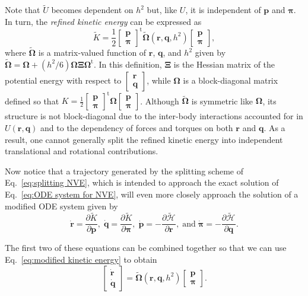\documentclass[
	aip,
	jcp,
	reprint,
]{revtex4-1}
\newcommand{\mt}[1]{\boldsymbol{\mathbf{#1}}}          %
\newcommand{\vt}[1]{\boldsymbol{\mathbf{#1}}}          %
\newcommand{\tr}[1]{#1^\text{t}}                       %
\newcommand{\diff}[2]{\frac{\partial #1}{\partial #2}} %
\newcommand{\Ham}[1]{{\mathcal H}_\text{#1}}           %
\newcommand{\timestep}{h}
\newcommand{\refined}[1]{\widetilde{#1}}
\begin{document}
Note that $\refined U$ becomes dependent on $\timestep^2$ but, like $U$, it is independent of $\vt p$ and $\vt \pi$.
In turn, the \textit{refined kinetic energy} can be expressed as
\begin{equation}
\label{eq:modified kinetic energy}
\refined K = \frac{1}{2} \tr{\left[\begin{array}{c} \vt p \\ \vt \pi \end{array}\right]} \refined{\mathbf \Omega}(\vt r, \vt q, \timestep^2) \left[\begin{array}{c} \vt p \\ \vt \pi \end{array}\right],
\end{equation}
where $\refined{\mathbf \Omega}$ is a matrix-valued function of $\vt r$, $\vt q$, and $\timestep^2$ given by $\tilde{\mt \Omega} = {\mt \Omega} + ({\timestep^2}/{6}) {\mt \Omega} {\mt \Xi} \tr{\mt \Omega}$.
In this definition, $\mt \Xi$ is the Hessian matrix of the potential energy with respect to $[\substack{\vt r \\ \vt q}]$, while ${\mt \Omega}$ is a block-diagonal matrix defined so that $K = \frac{1}{2} \tr{[\substack{\vt p \\ \vt \pi}]} {\mt \Omega} [\substack{\vt p \\ \vt \pi}]$.
Although $\refined{\mathbf \Omega}$ is symmetric like $\mt \Omega$, its structure is not block-diagonal due to the inter-body interactions accounted for in $U(\vt r, \vt q)$ and to the dependency of forces and torques on both $\vt r$ and $\vt q$.
As a result, one cannot generally split the refined kinetic energy into independent translational and rotational contributions.

Now notice that a trajectory generated by the splitting scheme of Eq.~\eqref{eq:splitting NVE}, which is intended to approach the exact solution of Eq.~\eqref{eq:ODE system for NVE}, will even more closely approach the solution of a modified ODE system given by
\begin{equation*}
\dot{\vt r} = \diff{\refined K}{\vt p}, \;
\dot{\vt q} = \diff{\refined K}{\vt \pi}, \;
\dot{\vt p} = -\diff{\refined{\Ham{}}}{\vt r}, \; \text{and} \;
\dot{\vt \pi} = -\diff{\refined{\Ham{}}}{\vt q}.
\end{equation*}

The first two of these equations can be combined together so that we can use Eq.~\eqref{eq:modified kinetic energy} to obtain
\begin{equation}
\label{eq:shadow ODE system}
\left[\begin{array}{c} \dot{\vt r} \\ \dot{\vt q} \end{array}\right] = \refined{\mathbf \Omega}(\vt r, \vt q, \timestep^2) \left[\begin{array}{c} \vt p \\ \vt \pi \end{array}\right].
\end{equation}
\end{document}

